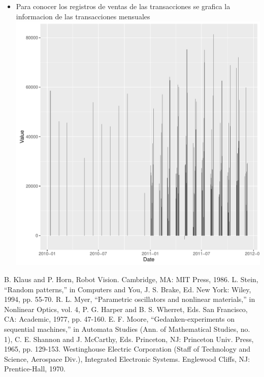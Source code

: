 \documentclass[conference]{IEEEtran}\usepackage[]{graphicx}\usepackage[]{color}
\makeatletter
\def\maxwidth{ %
  \ifdim\Gin@nat@width>\linewidth
    \linewidth
  \else
    \Gin@nat@width
  \fi
}
\newenvironment{knitrout}{}{} %
\makeatother
\begin{document}
\begin{itemize}
\begin{knitrout}
\end{knitrout}

  \item Para conocer los registros de ventas de las transacciones se grafica la informacion de las transacciones mensuales
\begin{knitrout}
\color{fgcolor}
\includegraphics[width=\maxwidth]{figure/histograma_transacciones-1} 

\end{knitrout}
  
\end{itemize}







\begin{thebibliography}{1}
		
		B. Klaus and P. Horn, Robot Vision. Cambridge, MA: MIT Press, 1986. 
		L. Stein, “Random patterns,” in Computers and You, J. S. Brake, Ed. New York: Wiley, 1994, pp. 55-70.
		R. L. Myer, “Parametric oscillators and nonlinear materials,” in Nonlinear Optics, vol. 4, P. G. Harper and B. S.
		Wherret, Eds. San Francisco, CA: Academic, 1977, pp. 47-160.
		E. F. Moore, “Gedanken-experiments on sequential machines,” in Automata Studies (Ann. of Mathematical
		Studies, no. 1), C. E. Shannon and J. McCarthy, Eds. Princeton, NJ: Princeton Univ. Press, 1965, pp. 129-153.
		Westinghouse Electric Corporation (Staff of Technology and Science, Aerospace Div.), Integrated Electronic
		Systems. Englewood Cliffs, NJ: Prentice-Hall, 1970. 

\end{thebibliography}
\end{document}
